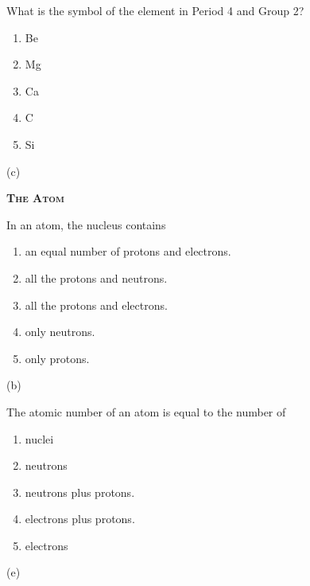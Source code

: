 \documentclass[main.tex]{subfiles}
\begin{document}
\begin{multicols*}{2}
\begin{question}[ID=9]
What is the symbol of the element in Period 4 and Group 2?
\begin{multicols}{2}
  \noindent
  \begin{enumerate} [topsep=0pt, partopsep=1pt, label=(\alph*), leftmargin=1cm]
\item Be
\item Mg
\item Ca
\item C
\item Si
\end{enumerate}
\end{multicols}    
\end{question}
\begin{solution}
(c)
\hspace{0.1cm}\end{solution}


{\raggedright\textsc{\textbf{The Atom }}\par}

\begin{question}[ID=10]
In an atom, the nucleus contains 
  \noindent
  \begin{enumerate} [topsep=0pt, partopsep=1pt, label=(\alph*), leftmargin=1cm]
\item an equal number of protons and electrons.
\item all the protons and neutrons.
\item all the protons and electrons.
\item only neutrons.
\item only protons.
\end{enumerate}
\end{question}
\begin{solution}
(b)
\hspace{0.1cm}\end{solution}

\begin{question}[ID=11]
The atomic number of an atom is equal to the number of  
  \noindent
  \begin{enumerate} [topsep=0pt, partopsep=1pt, label=(\alph*), leftmargin=1cm]
\item nuclei
\item neutrons
\item neutrons plus protons.
\item electrons plus protons.
\item electrons
\end{enumerate}
\end{question}
\begin{solution}
(e)
\hspace{0.1cm}\end{solution}



\end{multicols*}
\end{document}
